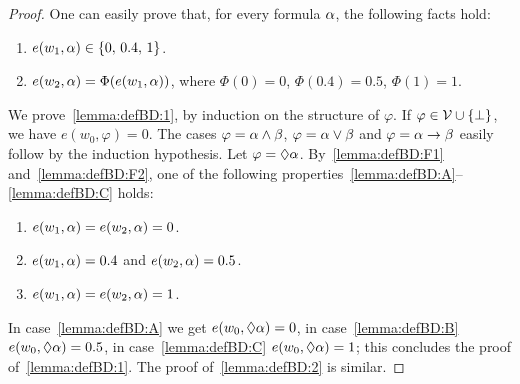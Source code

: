 \begin{proof}
  One can easily prove that, for every formula $\alpha$, the following
  facts hold:
  
  \begin{enumerate}[label=(\arabic*), ref=(\arabic*),leftmargin=*]    
  \item\label{lemma:defBD:F1}
    $e(w_1,\alpha)\in\{0,\,0.4,\,1\}$.
    
  \item\label{lemma:defBD:F2}
    $e(w_2,\alpha)=\Phi(e(w_1,\alpha))$,
    where $\Phi(0)=0$,  $\Phi(0.4)=0.5$, $\Phi(1)=1$.
  \end{enumerate}
  We prove~\ref{lemma:defBD:1}, by induction on the structure of
  $\varphi$.  If $\varphi\in\mathcal{V}\cup\{\bot\}$, we have $e(w_0,\varphi)
  = 0$.  The cases $\varphi=\alpha\land \beta$, $\varphi=\alpha\lor \beta$ and
  $\varphi=\alpha\to \beta$ easily follow by the induction hypothesis.  Let
  $\varphi = \lozenge \alpha$.  By~\ref{lemma:defBD:F1}
  and~\ref{lemma:defBD:F2}, one of the following
  properties~\ref{lemma:defBD:A}--\ref{lemma:defBD:C} holds:

  
  \begin{enumerate}[label=(\alph*), ref=(\alph*),leftmargin=*]    
  \item\label{lemma:defBD:A} $e(w_1,\alpha) = e(w_2,\alpha) = 0$.
    
  \item\label{lemma:defBD:B} $e(w_1,\alpha) = 0.4$ and $e(w_2,\alpha) = 0.5$.

  \item\label{lemma:defBD:C} $e(w_1,\alpha) = e(w_2,\alpha) = 1$.
  \end{enumerate}
  In case~\ref{lemma:defBD:A} we get $e(w_0,\lozenge \alpha)=0$, in
  case~\ref{lemma:defBD:B} $e(w_0,\lozenge \alpha)=0.5$, in
  case~\ref{lemma:defBD:C} $e(w_0,\lozenge \alpha)=1$; this concludes the
  proof of~\ref{lemma:defBD:1}.  The proof of~\ref{lemma:defBD:2} is
  similar.
\end{proof}


